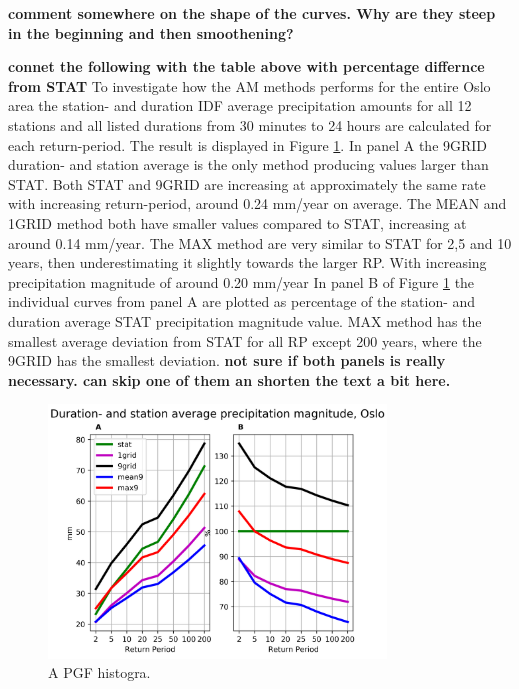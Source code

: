 \textbf{comment somewhere on the shape of the curves. Why are they steep in the beginning and then smoothening?}

\textbf{connet the following with the table above with percentage differnce from STAT} To investigate how the AM methods performs for the entire Oslo area the station- and duration IDF average precipitation amounts for all 12 stations and all listed durations from 30 minutes to 24 hours are calculated for each return-period. The result is displayed in Figure \ref{fig:table_dur_stat}. In panel A the 9GRID duration- and station average is the only method producing values larger than STAT. Both STAT and 9GRID are increasing at approximately the same rate with increasing return-period, around 0.24 mm/year on average. The MEAN and 1GRID method both have smaller values compared to STAT, increasing at around 0.14 mm/year. The MAX method are very similar to STAT for 2,5 and 10 years, then underestimating it slightly towards the larger RP. With increasing precipitation magnitude of around 0.20 mm/year In panel B of Figure \ref{fig:table_dur_stat} the individual curves from panel A are plotted as percentage of the station- and duration average STAT precipitation magnitude value. MAX method has the smallest average deviation from STAT for all RP except 200 years, where the 9GRID has the smallest deviation. \textbf{not sure if both panels is really necessary. can skip one of them an shorten the text a bit here.}      

\begin{figure}
    \begin{center}
        \includegraphics[width=0.8\textwidth, height =0.5\textwidth]{figures/table_avg_dur_stat.png}
    \end{center}
    \caption{A PGF histogra.}
    \label{fig:table_dur_stat}
\end{figure}

